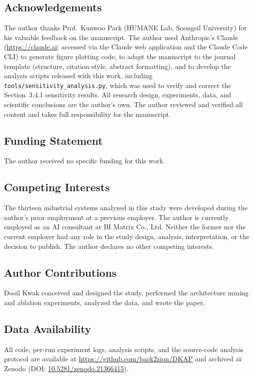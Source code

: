 \documentclass[fleqn,10pt,lineno]{wlpeerj}
\begin{document}
\subsection*{Acknowledgements}
The author thanks Prof.\ Kunwoo Park (HUMANE Lab, Soongsil University) for his valuable feedback on the manuscript. The author used Anthropic's Claude (\url{https://claude.ai}; accessed via the Claude web application and the Claude Code CLI) to generate figure plotting code, to adapt the manuscript to the journal template (structure, citation style, abstract formatting), and to develop the analysis scripts released with this work, including \texttt{tools/sensitivity\_analysis.py}, which was used to verify and correct the Section~3.4.1 sensitivity results. All research design, experiments, data, and scientific conclusions are the author's own. The author reviewed and verified all content and takes full responsibility for the manuscript.

\subsection*{Funding Statement}
The author received no specific funding for this work.

\subsection*{Competing Interests}
The thirteen industrial systems analyzed in this study were developed during the author's prior employment at a previous employer. The author is currently employed as an AI consultant at BI Matrix Co., Ltd. Neither the former nor the current employer had any role in the study design, analysis, interpretation, or the decision to publish. The author declares no other competing interests.

\subsection*{Author Contributions}
Dooil Kwak conceived and designed the study, performed the architecture mining and ablation experiments, analyzed the data, and wrote the paper.

\subsection*{Data Availability}
All code, per-run experiment logs, analysis scripts, and the source-code analysis protocol are available at \url{https://github.com/back2zion/DKAP} and archived at Zenodo (DOI: \href{https://doi.org/10.5281/zenodo.21366415}{10.5281/zenodo.21366415}).


\end{document}
